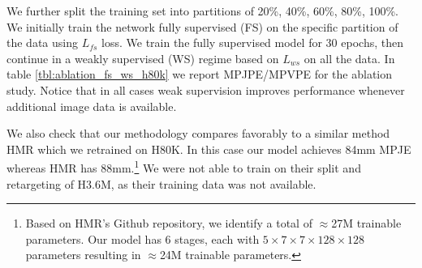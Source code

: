 \documentclass[runningheads]{llncs}
\begin{document}
We further split the training set into partitions of 20\%, 40\%, 60\%, 80\%, 100\%. We initially train the network fully supervised (FS) on the specific partition of the data using $L_{fs}$ loss. We train the fully supervised model for 30 epochs, then continue in a weakly supervised (WS) regime based on $L_{ws}$ on all the data. 
In table \ref{tbl:ablation_fs_ws_h80k} we report MPJPE/MPVPE for the ablation study. Notice  that in all cases weak supervision improves performance whenever additional image data is available.

We also check that our methodology compares favorably to a similar method HMR \cite{Kanazawa2018} which we retrained on H80K. In this case our model achieves 84mm MPJE whereas HMR has 88mm.\footnote{Based on HMR's Github repository, we identify a total of $\approx$27M trainable parameters. 
Our model has 6 stages, each with $5 \times 7 \times 7 \times 128 \times 128$ parameters resulting in $\approx$24M trainable parameters. } We were not able to train on their split and retargeting of H3.6M, as their training data was not available.
\end{document}
